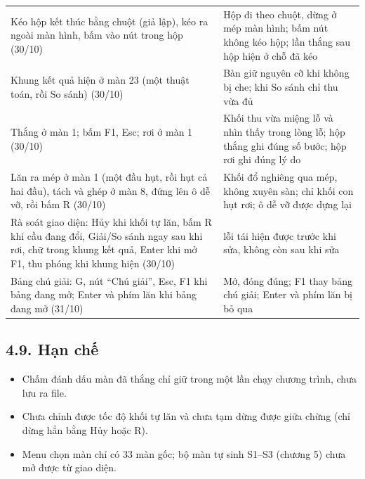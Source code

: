{\begin{longtable}[]{@{}
  >{\raggedright\arraybackslash}p{}
  >{\raggedright\arraybackslash}p{}@{}}
\rowrule
Kéo hộp kết thúc bằng chuột (giả lập), kéo ra ngoài màn hình, bấm vào nút trong hộp (30/10) & Hộp đi theo chuột, dừng ở mép màn hình; bấm nút không kéo hộp; lần thắng sau hộp hiện ở chỗ đã kéo \\
\rowrule
Khung kết quả hiện ở màn 23 (một thuật toán, rồi So sánh) (30/10) & Bàn giữ nguyên cỡ khi không bị che; khi So sánh chỉ thu vừa đủ \\
\rowrule
Thắng ở màn 1; bấm F1, Esc; rơi ở màn 1 (30/10) & Khối thu vừa miệng lỗ và nhìn thấy trong lòng lỗ; hộp thắng ghi đúng số bước; hộp rơi ghi đúng lý do \\
\rowrule
Lăn ra mép ở màn 1 (một đầu hụt, rồi hụt cả hai đầu), tách và ghép ở màn 8, đứng lên ô dễ vỡ, rồi bấm R (30/10) & Khối đổ nghiêng qua mép, không xuyên sàn; chỉ khối con hụt rơi; ô dễ vỡ được dựng lại \\
\rowrule
Rà soát giao diện: Hủy khi khối tự lăn, bấm R khi cầu đang đổi, Giải/So sánh ngay sau khi rơi, chữ trong khung kết quả, Enter khi mở F1, thu phóng khi khung hiện (30/10) & 6 lỗi tái hiện được trước khi sửa, không còn sau khi sửa \\
\rowrule
Bảng chú giải: G, nút ``Chú giải'', Esc, F1 khi bảng đang mở; Enter và phím lăn khi bảng đang mở (31/10) & Mở, đóng đúng; F1 thay bảng chú giải; Enter và phím lăn bị bỏ qua \\
\end{longtable}
}

\subsection{4.9. Hạn chế}

\begin{itemize}
\tightlist
\item
  Chấm đánh dấu màn đã thắng chỉ giữ trong một lần chạy chương trình, chưa lưu ra file.
\item
  Chưa chỉnh được tốc độ khối tự lăn và chưa tạm dừng được giữa chừng (chỉ dừng hẳn bằng Hủy hoặc R).
\item
  Menu chọn màn chỉ có 33 màn gốc; bộ màn tự sinh S1--S3 (chương 5) chưa mở được từ giao diện.
\end{itemize}
